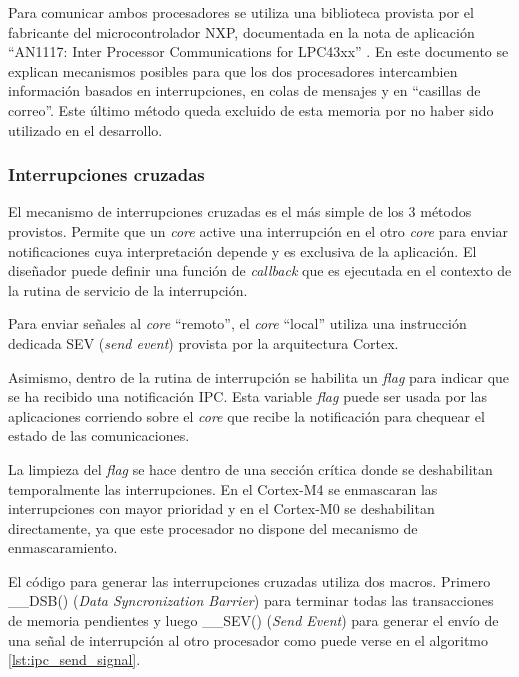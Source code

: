 Para comunicar ambos procesadores se utiliza una biblioteca provista por el fabricante del microcontrolador NXP, documentada en la nota de aplicación ``AN1117: Inter Processor Communications for LPC43xx'' \citep{nxp:an1117}. En este documento se explican mecanismos posibles para que los dos procesadores intercambien información basados en interrupciones, en colas de mensajes y en ``casillas de correo''.  Este último método queda excluido de esta memoria por no haber sido utilizado en el desarrollo.

\subsubsection{Interrupciones cruzadas}
\label{subsubsec:interrupcion}

El mecanismo de interrupciones cruzadas es el más simple de los 3 métodos provistos.  Permite que un \textit{core} active una interrupción en el otro \textit{core} para enviar notificaciones cuya interpretación depende y es exclusiva de la aplicación.  El diseñador puede definir una función de \textit{callback} que es ejecutada en el contexto de la rutina de servicio de la interrupción.  

Para enviar señales al \textit{core} ``remoto'', el \textit{core} ``local'' utiliza una instrucción dedicada SEV (\textit{send event}) provista por la arquitectura Cortex.

Asimismo, dentro de la rutina de interrupción se habilita un \textit{flag} para indicar que se ha recibido una notificación IPC.  Esta variable \textit{flag} puede ser usada por las aplicaciones corriendo sobre el \textit{core} que recibe la notificación para chequear el estado de las comunicaciones. 

La limpieza del \textit{flag} se hace dentro de una sección crítica donde se deshabilitan temporalmente las interrupciones. En el Cortex-M4 se enmascaran las interrupciones con mayor prioridad y en el Cortex-M0 se deshabilitan directamente, ya que este procesador no dispone del mecanismo de enmascaramiento.

El código para generar las interrupciones cruzadas utiliza dos macros. Primero \_\_DSB() (\textit{Data Syncronization Barrier}) para terminar todas las transacciones de memoria pendientes y luego \_\_SEV() (\textit{Send Event}) para generar el envío de una señal de interrupción al otro procesador como puede verse en el algoritmo \ref{lst:ipc_send_signal}.

